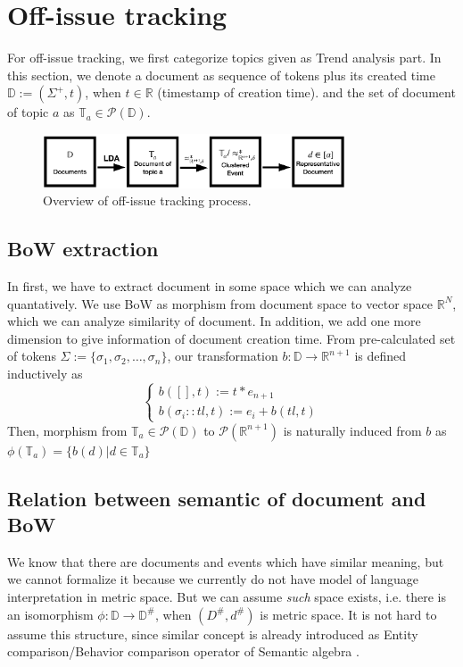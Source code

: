 \section{Off-issue tracking}
For off-issue tracking, we first categorize topics given as Trend analysis part.
In this section, we denote a document as sequence of tokens plus its created time $\mathbb{D} := (\Sigma^{+}, t)$, when $t \in \mathbb{R}$ (timestamp of creation time).
and the set of document of topic $a$ as $\mathbb{T}_{a} \in \mathcal{P}(\mathbb{D})$.

\begin{figure}[t]
    \centering
    \includegraphics[width=0.8\textwidth]{off-issue-overview}
    \caption{Overview of off-issue tracking process.}
\end{figure}

\subsection{BoW extraction}
In first, we have to extract document in some space which we can analyze quantatively.
We use BoW as morphism from document space to vector space $\mathbb{R}^{N}$, which we can
analyze similarity of document. In addition, we add one more dimension to give information
of document creation time. From pre-calculated set of tokens $\Sigma := \{ \sigma_{1}, \sigma_{2}, \ldots, \sigma_{n} \}$,
our transformation $b: \mathbb{D} \rightarrow \mathbb{R}^{n+1}$ is defined inductively as
\[
\begin{cases}
    b([], t) := t * e_{n+1}\\
    b(\sigma_{i} :: tl, t) := e_{i} + b(tl, t)
\end{cases} 
\]
Then, morphism from $\mathbb{T}_{a} \in \mathcal{P}(\mathbb{D})$ to $\mathcal{P}(\mathbb{R}^{n+1})$ is naturally induced from $b$ as
$\phi(\mathbb{T}_{a}) = \{b(d) | d \in \mathbb{T}_{a}\}$

\subsection{Relation between semantic of document and BoW}
We know that there are documents and events which have similar meaning, but we cannot formalize it because we currently do not have
model of language interpretation in metric space. But we can assume \textit{such} space exists, i.e. there is an isomorphism
$\phi: \mathbb{D} \rightarrow \mathbb{D}^{\#}$, when $(D^{\#}, d^{\#})$ is metric space. It is not hard to assume this structure,
since similar concept is already introduced as Entity comparison/Behavior comparison operator of Semantic algebra \cite{wang2013semantic}.

